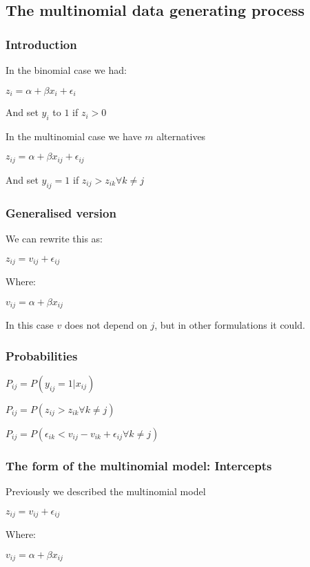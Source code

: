 
\subsection{The multinomial data generating process}

\subsubsection{Introduction}

In the binomial case we had:

\(z_i=\alpha + \beta x_i +\epsilon_i \)

And set \(y_i\) to \(1\) if \(z_i>0\)

In the multinomial case we have \(m\) alternatives

\(z_{ij}=\alpha + \beta x_{ij} +\epsilon_{ij} \)

And set \(y_{ij}=1\) if \(z_{ij}>z_{ik}\forall k\ne j\)

\subsubsection{Generalised version}

We can rewrite this as:

\(z_{ij}=v_{ij} +\epsilon_{ij} \)

Where:

\(v_{ij}=\alpha+\beta x_{ij}\)

In this case \(v\) does not depend on \(j\), but in other formulations it could.

\subsubsection{Probabilities}

\(P_{ij}=P(y_{ij}=1|x_{ij})\)

\(P_{ij}=P(z_{ij}>z_{ik}\forall k\ne j)\)

\(P_{ij}=P(\epsilon_{ik} <v_{ij} -v_{ik} +\epsilon_{ij}\forall k\ne j)\)

\subsubsection{The form of the multinomial model: Intercepts}

Previously we described the multinomial model

\(z_{ij}=v_{ij} +\epsilon_{ij} \)

Where:

\(v_{ij}=\alpha+\beta x_{ij}\)

